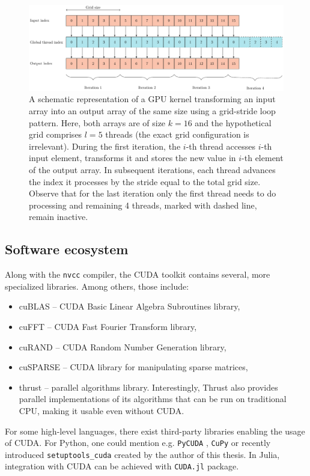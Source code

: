 \begin{example}
\begin{figure}
  \includegraphics[width=\textwidth]{figures/gpu_scheduling}
  \caption{A schematic representation of a GPU kernel transforming an input array into an output array of the same size using a grid-stride loop pattern. Here, both arrays are of size $k=16$ and the hypothetical grid comprises $l=5$ threads (the exact grid configuration is irrelevant). During the first iteration, the $i$-th thread accesses $i$-th input
  element, transforms it and stores the new value in $i$-th element of the output array. In subsequent iterations, each thread advances the index it processes by the stride equal to the total grid size. Observe that for the last iteration only the first thread needs to do processing and remaining 4 threads, marked with dashed line, remain inactive.
  }
  \label{fig:strided-loop}
\end{figure}

\end{example}

\subsection{Software ecosystem}
Along with the \texttt{nvcc} compiler, the CUDA toolkit contains several, more specialized libraries. Among others, those include:
\begin{itemize}
    \item cuBLAS \cite{cublas} -- CUDA Basic Linear Algebra Subroutines library,
    \item cuFFT \cite{cufft} -- CUDA Fast Fourier Transform library,
    \item cuRAND \cite{curand} -- CUDA Random Number Generation library,
    \item cuSPARSE \cite{cusparse} -- CUDA library for manipulating sparse matrices,
    \item thrust \cite{thrust} -- parallel algorithms library. Interestingly, Thrust also provides parallel
    implementations of its algorithms that can be run on traditional CPU, making it usable even
    without CUDA.
\end{itemize}

For some high-level languages, there exist third-party libraries enabling the usage of CUDA. For
Python, one could mention e.g. \texttt{PyCUDA} \cite{pycuda}, \texttt{CuPy} \cite{cupy} or recently introduced
\texttt{setuptools\_cuda} \cite{setuptoolscuda} created by the author of this thesis. In Julia, integration with CUDA can be achieved with \texttt{CUDA.jl} \cite{CUDAjl} package.



